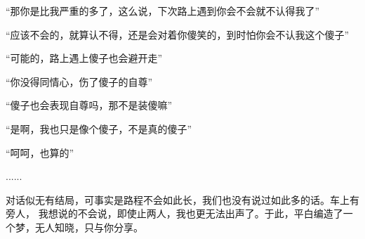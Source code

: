 \begin{adjustwidth}{0cm}{0cm}
{        “那你是比我严重的多了，这么说，下次路上遇到你会不会就不认得我了”

        “应该不会的，就算认不得，还是会对着你傻笑的，到时怕你会不认我这个傻子”

        “可能的，路上遇上傻子也会避开走”

        “你没得同情心，伤了傻子的自尊”

        “傻子也会表现自尊吗，那不是装傻嘛”

        “是啊，我也只是像个傻子，不是真的傻子”

        “呵呵，也算的”

        ...... 

        \hspace*{2em} 对话似无有结局，可事实是路程不会如此长，我们也没有说过如此多的话。车上有旁人，
        我想说的不会说，即使止两人，我也更无法出声了。于此，平白编造了一个梦，无人知晓，只与你分享。
    }
\end{adjustwidth}
\newpage